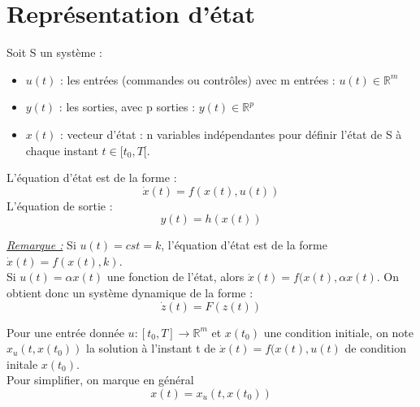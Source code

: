 \section{Représentation d'état}
Soit S un système :\\

\begin{itemize}
	\item $u(t)$ : les entrées (commandes ou contrôles) avec m entrées : $u(t)\in\mathbb{R}^m$
	\item $y(t)$ : les sorties, avec p sorties : $y(t)\in\mathbb{R}^p$
	\item $x(t)$ : vecteur d'état : n variables indépendantes pour définir l'état de S à chaque instant $t\in[t_0,T[$. 
\end{itemize}

L'équation d'état est de la forme : 
\[\dot{x}(t)=f(x(t),u(t))\]
L'équation de sortie :
\[y(t)=h(x(t))\]


\underline{\textit{Remarque :}} Si $u(t)=cst=k$, l'équation d'état est de la forme $\dot{x}(t)=f(x(t),k)$.\\
Si $u(t)=\alpha x(t)$ une fonction de l'état, alors $\dot{x}(t)=f(x(t),\alpha x(t)$. On obtient donc un système dynamique de la forme :
\[\dot{z}(t)=F(z(t))\]

\bigskip
Pour une entrée donnée $u:[t_0,T]\to\mathbb{R}^m$ et $x(t_0)$ une condition initiale, on note $x_u(t,x(t_0))$ la solution à l'instant t de $\dot{x}(t)=f(x(t),u(t)$ de condition initale $x(t_0)$.\\
Pour simplifier, on marque en général 
\[x(t)=x_u(t,x(t_0))\]

